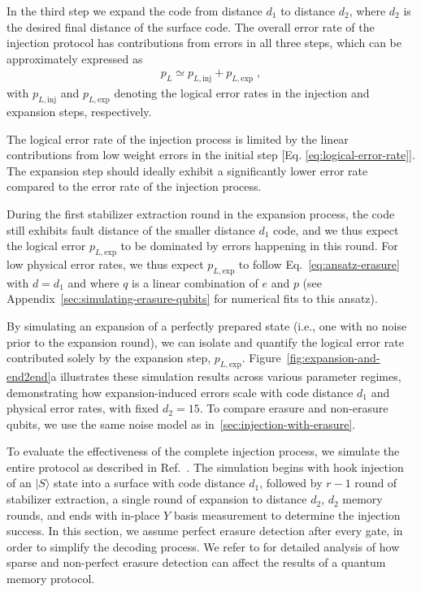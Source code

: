 \documentclass[twocolumn,
notitlepage,
aps,
prx,
floatfix,
superscriptaddress
]{revtex4-2}
\begin{document}
In the third step we expand the code from distance $d_1$ to distance $d_2$, where $d_2$ is the desired final distance of the surface code.
The overall error rate of the injection protocol has contributions from errors in all three steps, 
which can be approximately expressed as
\begin{align}
    p_L \simeq p_{L,\text{inj}} + p_{L,\text{exp}}\;,
\end{align}
with $p_{L,\text{inj}}$ and $p_{L,\text{exp}}$ denoting the logical error rates in the injection and expansion steps, respectively.

The logical error rate of the injection process is limited by the linear contributions from low weight errors in the initial step [Eq. \eqref{eq:logical-error-rate}].
The expansion step should ideally exhibit a significantly lower error rate compared to the error rate of the injection process.

During the first stabilizer extraction round in the expansion process, the code still exhibits fault distance of the smaller distance $d_1$ code, and we thus expect the logical error $p_{L,\text{exp}}$ to be dominated by errors happening in this round. For low physical error rates, we thus expect $p_{L,\text{exp}}$ to follow Eq.~\eqref{eq:ansatz-erasure} with $d=d_1$ and where $q$ is a linear combination of $e$ and $p$ (see Appendix~\ref{sec:simulating-erasure-qubits} for numerical fits to this ansatz).

By simulating an expansion of a perfectly prepared state (i.e., one with no noise prior to the expansion round), we can isolate and quantify the logical error rate contributed solely by the expansion step, $p_{L,\text{exp}}$.
Figure~\ref{fig:expansion-and-end2end}a illustrates these simulation results across various parameter regimes, demonstrating how expansion-induced errors scale with code distance $d_1$ and physical error rates, with fixed $d_2=15$.
To compare erasure and non-erasure qubits, we use the same noise model as in~\ref{sec:injection-with-erasure}.

\label{subsection:success_rate_simulation}

To evaluate the effectiveness of the complete injection process, we simulate the entire protocol as described in Ref.~\cite{gidney_hook_injection}. The simulation begins with hook injection of an $|S\rangle$ state into a surface with code distance $d_1$, followed by $r-1$ round of stabilizer extraction, a single round of expansion to distance $d_2$, $d_2$ memory rounds, and ends with in-place $Y$ basis measurement \cite{Gidney_2024inpace-Y} to determine the injection success. In this section, we assume perfect erasure detection after every gate, in order to simplify the decoding process. We refer to \cite{Bailey_optimization_2024} for detailed analysis of how sparse and non-perfect erasure detection can affect the results of a quantum memory protocol.
\end{document}
